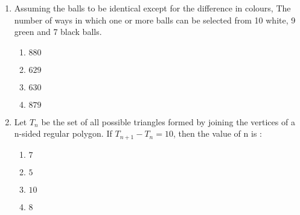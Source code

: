 \documentclass[journal,12pt,twocolumn]{IEEEtran}
\theoremstyle{remark}
\begin{document}
\begin{enumerate}
\item Assuming the balls to be identical except for the difference in colours, The number of ways in which one or more balls can be selected from 10 white, 9 green and 7 black balls. \hfill {}
	\begin{multicols}{4}
	\begin{enumerate}
     \item $880$
     \item $629$
     \item $630$
     \item $879$
        \end{enumerate}
	\end{multicols}
\item Let $T_n$ be the set of all possible triangles formed by joining the vertices of a n-sided regular polygon. If $T_{n+1} - T_n = 10$, then the value of n is : \hfill {}
	\begin{multicols}{4}
	\begin{enumerate}
     \item $7$
     \item $5$
     \item $10$
     \item $8$
        \end{enumerate}
	\end{multicols}
\end{enumerate}
 
\end{document}
